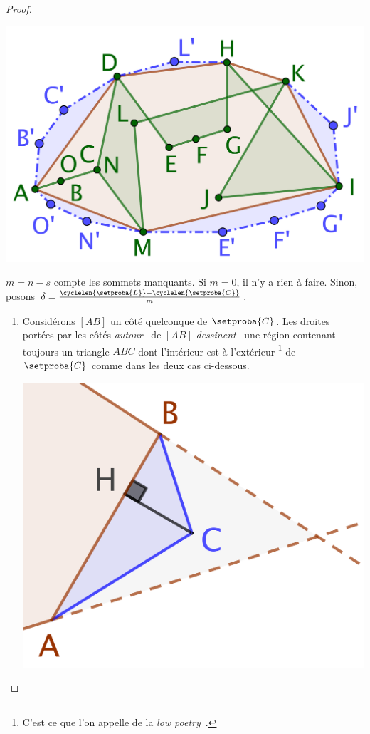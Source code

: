 \begin{proof}
	\begin{center}
		\includegraphics[scale=.45]{content/polygon/sol-is/convex-hull-distortion.png}
	\end{center}


	$m = n - s$ compte les sommets manquants.
	Si $m = 0$, il n'y a rien à faire.
	Sinon, posons $\delta = \frac{\cyclelen{\setproba{L}} - \cyclelen{\setproba{C}}}{m}$.
	\begin{enumerate}
		\item \label{add-vertex-start}
		Considérons $[AB]$ un côté quelconque de $\setproba{C}$.
		Les droites portées par les côtés \og \emph{autour} \fg\ de $[AB]$ \og \emph{dessinent} \fg\ une région contenant toujours un triangle $ABC$ dont l'intérieur est à l'extérieur
		\footnote{
			C'est ce que l'on appelle de la \og \emph{low poetry} \fg\,.
		}
		de $\setproba{C}$ comme dans les deux cas ci-dessous.
		\begin{multicols}{2}
			\centering

			\includegraphics[scale=.35]{content/polygon/sol-is/add-vertex-1.png}


\end{multicols}
\end{enumerate}
\end{proof}
